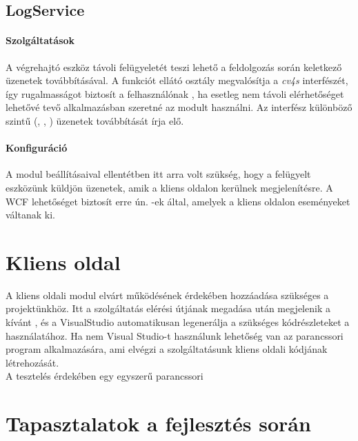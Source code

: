 \subsection{LogService}

\paragraph{Szolgáltatások} A végrehajtó eszköz távoli felügyeletét teszi lehető a feldolgozás során keletkező üzenetek továbbításával. A funkciót ellátó osztály megvalósítja a \emph{cv4s}  interfészét, így rugalmasságot biztosít a felhasználónak , ha esetleg nem távoli elérhetőséget lehetővé tevő alkalmazásban szeretné az  modult használni. Az interfész különböző szintű (, , ) üzenetek továbbítását írja elő.

\paragraph{Konfiguráció} A  modul beállításaival ellentétben itt arra volt szükség, hogy a felügyelt eszközünk küldjön üzenetek, amik a kliens oldalon kerülnek megjelenítésre. A WCF lehetőséget biztosít erre ún. -ek által, amelyek a kliens oldalon eseményeket váltanak ki.

\section{Kliens oldal}

A kliens oldali modul elvárt működésének érdekében  hozzáadása szükséges a projektünkhöz. Itt a szolgáltatás elérési útjának megadása után megjelenik a kívánt , és a VisualStudio automatikusan legenerálja a szükséges kódrészleteket a használatához. Ha nem Visual Studio-t használunk lehetőség van az  parancssori program alkalmazására, ami elvégzi a szolgáltatásunk kliens oldali kódjának létrehozását. \\
A tesztelés érdekében egy egyszerű parancssori 


\section{Tapasztalatok a fejlesztés során}

